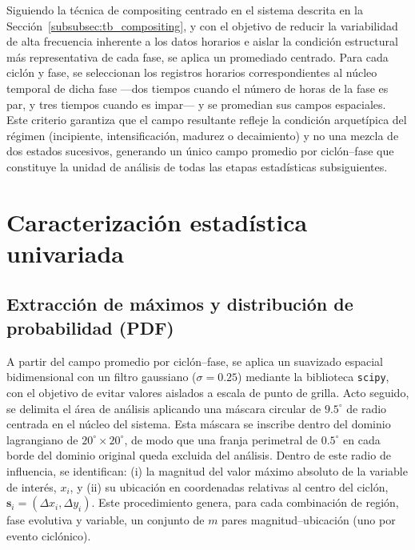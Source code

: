 Siguiendo la técnica de compositing centrado en el sistema descrita en la Sección~\ref{subsubsec:tb_compositing}, y con el objetivo de reducir la variabilidad de alta frecuencia inherente a los datos horarios e aislar la condición estructural más representativa de cada fase, se aplica un promediado centrado. Para cada ciclón y fase, se seleccionan los registros horarios correspondientes al núcleo temporal de dicha fase ---dos tiempos cuando el número de horas de la fase es par, y tres tiempos cuando es impar--- y se promedian sus campos espaciales. Este criterio garantiza que el campo resultante refleje la condición arquetípica del régimen (incipiente, intensificación, madurez o decaimiento) y no una mezcla de dos estados sucesivos, generando un único campo promedio por ciclón--fase que constituye la unidad de análisis de todas las etapas estadísticas subsiguientes.


\section{Caracterización estadística univariada}\label{sec:tecnicas_estadisticas}

\subsection{Extracción de máximos y distribución de probabilidad (PDF)}\label{subsec:extraccion_pdf}

A partir del campo promedio por ciclón--fase, se aplica un suavizado espacial bidimensional con un filtro gaussiano ($\sigma = 0.25$) mediante la biblioteca \texttt{scipy}, con el objetivo de evitar valores aislados a escala de punto de grilla. Acto seguido, se delimita el área de análisis aplicando una máscara circular de $9.5^{\circ}$ de radio centrada en el núcleo del sistema. Esta máscara se inscribe dentro del dominio lagrangiano de $20^{\circ} \times 20^{\circ}$, de modo que una franja perimetral de $0.5^{\circ}$ en cada borde del dominio original queda excluida del análisis. Dentro de este radio de influencia, se identifican: (i) la magnitud del valor máximo absoluto de la variable de interés, $x_i$, y (ii) su ubicación en coordenadas relativas al centro del ciclón, $\mathbf{s}_i = (\Delta x_i, \Delta y_i)$. Este procedimiento genera, para cada combinación de región, fase evolutiva y variable, un conjunto de $m$ pares magnitud--ubicación (uno por evento ciclónico).


